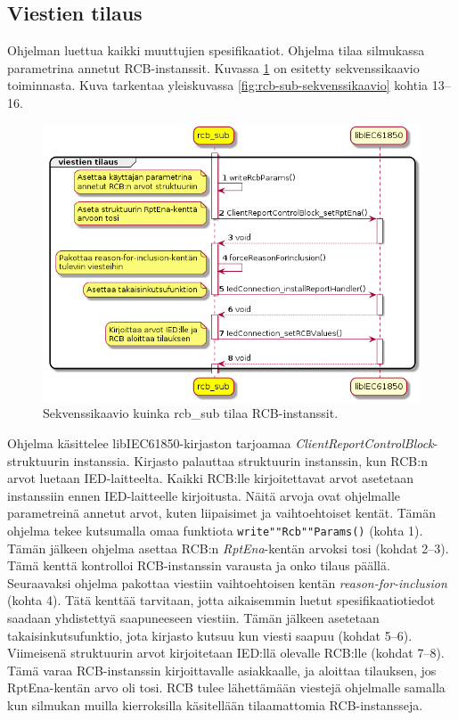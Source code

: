 \subsection{Viestien tilaus}
Ohjelman luettua kaikki muuttujien spesifikaatiot. Ohjelma tilaa silmukassa parametrina annetut RCB-instanssit. Kuvassa \ref{fig:rcb-sub-subscribe-reports} on esitetty sekvenssikaavio toiminnasta. Kuva tarkentaa yleiskuvassa \ref{fig:rcb-sub-sekvenssikaavio} kohtia 13--16.

\begin{figure}[ht!]
	\includegraphics[width=1\textwidth]{pictures/rcb-sub-subscribe-reports.png}
	\caption{Sekvenssikaavio kuinka rcb\_sub tilaa RCB-instanssit.}
	\label{fig:rcb-sub-subscribe-reports}
\end{figure}

Ohjelma käsittelee libIEC61850-kirjaston tarjoamaa \emph{ClientReportControlBlock}-struk\-tuu\-rin instanssia. Kirjasto palauttaa struktuurin instanssin, kun RCB:n arvot luetaan IED-laitteelta. Kaikki RCB:lle kirjoitettavat arvot asetetaan instanssiin ennen IED-laitteelle kirjoitusta. Näitä arvoja ovat ohjelmalle parametreinä annetut arvot, kuten liipaisimet ja vaihtoehtoiset kentät. Tämän ohjelma tekee kutsumalla omaa funktiota \texttt{write""Rcb""Params()} (kohta 1). Tämän jälkeen ohjelma asettaa RCB:n \emph{RptEna}-kentän arvoksi tosi (kohdat 2--3). Tämä kenttä kontrolloi RCB-instanssin varausta ja onko tilaus päällä. Seuraavaksi ohjelma pakottaa viestiin vaihtoehtoisen kentän \emph{reason-for-inclusion} (kohta 4). Tätä kenttää tarvitaan, jotta aikaisemmin luetut spesifikaatiotiedot saadaan yhdistettyä saapuneeseen viestiin. Tämän jälkeen asetetaan takaisinkutsufunktio, jota kirjasto kutsuu kun viesti saapuu (kohdat 5--6). Viimeisenä struktuurin arvot kirjoitetaan IED:llä olevalle RCB:lle (kohdat 7--8). Tämä varaa RCB-instanssin kirjoittavalle asiakkaalle, ja aloittaa tilauksen, jos RptEna-kentän arvo oli tosi. RCB tulee lähettämään viestejä ohjelmalle samalla kun silmukan muilla kierroksilla käsitellään tilaamattomia RCB-instansseja.


